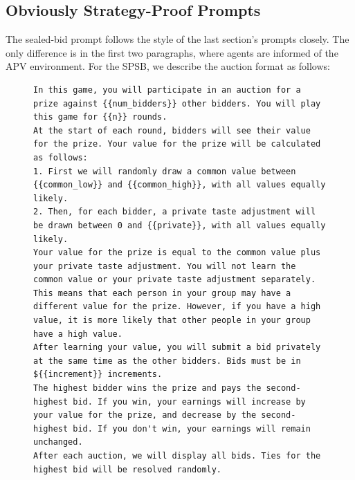\subsection{Obviously Strategy-Proof Prompts}\label{sec:osp-prompts}
The sealed-bid prompt follows the style of the last section's prompts closely. The only difference is in the first two paragraphs, where agents are informed of the APV environment. For the SPSB, we describe the auction format as follows:
\begin{figure}
\centering
\begin{minipage}{0.95\textwidth}
\begin{lstlisting}
In this game, you will participate in an auction for a prize against {{num_bidders}} other bidders. You will play this game for {{n}} rounds.
At the start of each round, bidders will see their value for the prize. Your value for the prize will be calculated as follows:
1. First we will randomly draw a common value between {{common_low}} and {{common_high}}, with all values equally likely.
2. Then, for each bidder, a private taste adjustment will be drawn between 0 and {{private}}, with all values equally likely.
Your value for the prize is equal to the common value plus your private taste adjustment. You will not learn the common value or your private taste adjustment separately. This means that each person in your group may have a different value for the prize. However, if you have a high value, it is more likely that other people in your group have a high value.
After learning your value, you will submit a bid privately at the same time as the other bidders. Bids must be in ${{increment}} increments. 
The highest bidder wins the prize and pays the second-highest bid. If you win, your earnings will increase by your value for the prize, and decrease by the second-highest bid. If you don't win, your earnings will remain unchanged.
After each auction, we will display all bids. Ties for the highest bid will be resolved randomly.
\end{lstlisting}
\end{minipage}
\label{fig:sealbid_prompt}
\end{figure}

